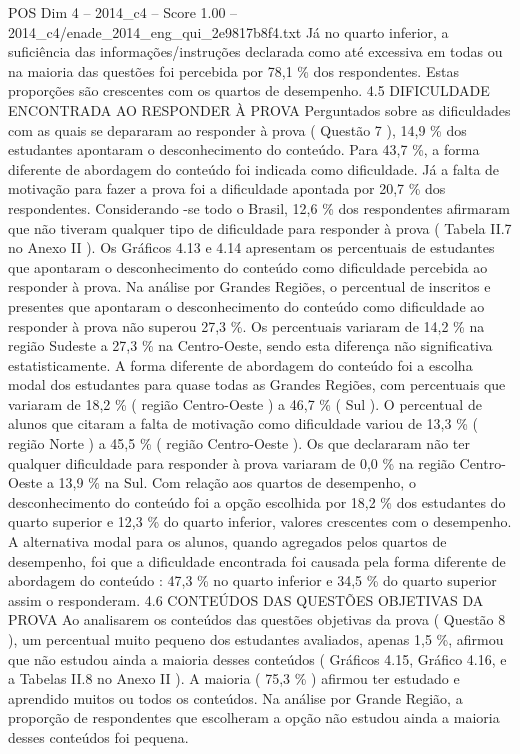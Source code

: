 \begin{textsample}{POS Dim 4 – 2014\_c4 – Score 1.00 – 2014\_c4/enade\_2014\_eng\_qui\_2e9817b8f4.txt}
Já no quarto inferior, a suficiência das informações/instruções declarada como até excessiva em todas ou na maioria das questões foi percebida por 78,1 \% dos respondentes.
Estas proporções são crescentes com os quartos de desempenho. 4.5 DIFICULDADE ENCONTRADA AO RESPONDER À PROVA Perguntados sobre as dificuldades com as quais se depararam ao responder à prova ( Questão 7 ), 14,9 \% dos estudantes apontaram o desconhecimento do conteúdo.
Para 43,7 \%, a forma diferente de abordagem do conteúdo foi indicada como dificuldade.
Já a falta de motivação para fazer a prova foi a dificuldade apontada por 20,7 \% dos respondentes.
Considerando -se todo o Brasil, 12,6 \% dos respondentes afirmaram que não tiveram qualquer tipo de dificuldade para responder à prova ( Tabela II.7 no Anexo II ).
Os Gráficos 4.13 e 4.14 apresentam os percentuais de estudantes que apontaram o desconhecimento do conteúdo como dificuldade percebida ao responder à prova.
Na análise por Grandes Regiões, o percentual de inscritos e presentes que apontaram o desconhecimento do conteúdo como dificuldade ao responder à prova não superou 27,3 \%.
Os percentuais variaram de 14,2 \% na região Sudeste a 27,3 \% na Centro-Oeste, sendo esta diferença não significativa estatisticamente.
A forma diferente de abordagem do conteúdo foi a escolha modal dos estudantes para quase todas as Grandes Regiões, com percentuais que variaram de 18,2 \% ( região Centro-Oeste ) a 46,7 \% ( Sul ).
O percentual de alunos que citaram a falta de motivação como dificuldade variou de 13,3 \% ( região Norte ) a 45,5 \% ( região Centro-Oeste ).
Os que declararam não ter qualquer dificuldade para responder à prova variaram de 0,0 \% na região Centro-Oeste a 13,9 \% na Sul.
Com relação aos quartos de desempenho, o desconhecimento do conteúdo foi a opção escolhida por 18,2 \% dos estudantes do quarto superior e 12,3 \% do quarto inferior, valores crescentes com o desempenho.
A alternativa modal para os alunos, quando agregados pelos quartos de desempenho, foi que a dificuldade encontrada foi causada pela forma diferente de abordagem do conteúdo : 47,3 \% no quarto inferior e 34,5 \% do quarto superior assim o responderam. 4.6 CONTEÚDOS DAS QUESTÕES OBJETIVAS DA PROVA Ao analisarem os conteúdos das questões objetivas da prova ( Questão 8 ), um percentual muito pequeno dos estudantes avaliados, apenas 1,5 \%, afirmou que não estudou ainda a maioria desses conteúdos ( Gráficos 4.15, Gráfico 4.16, e a Tabelas II.8 no Anexo II ).
A maioria ( 75,3 \% ) afirmou ter estudado e aprendido muitos ou todos os conteúdos.
Na análise por Grande Região, a proporção de respondentes que escolheram a opção não estudou ainda a maioria desses conteúdos foi pequena.

\end{textsample}
